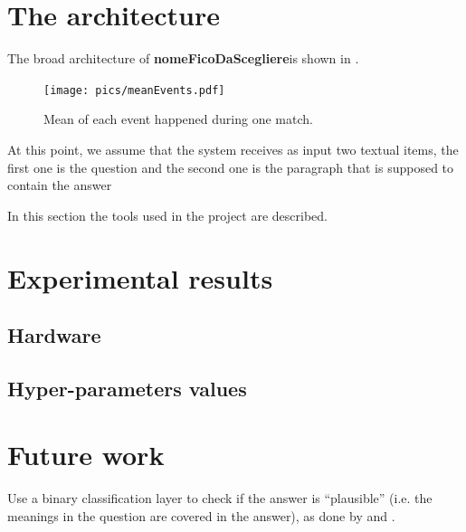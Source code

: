 \documentclass[12pt,a4paper,hidelinks]{article}
\newcommand{\nomefico}{\textbf{nomeFicoDaScegliere}}
\begin{document}
\section{The architecture}\label{sec:model}
The broad architecture of \nomefico is shown in .

\begin{figure}[ht!]
    \centering
    \texttt{[image: pics/meanEvents.pdf]}
    \caption{Mean of each event happened during one match.}
    \label{fig:meanEvents}
\end{figure}
At this point, we assume that the system receives as input two textual items, the first one is the question and the second one is the paragraph that is supposed to contain the answer


In this section the tools used in the project are described.

\section{Experimental results}\label{sec:experimental_results}


\subsection{Hardware}


\subsection{Hyper-parameters values}

\section{Future work}\label{sec:future_work}
Use a binary classification layer to check if the answer is ``plausible'' (i.e. the meanings in the question are covered in the answer), as done by \cite{Hu2019ReadV} and \cite{Back2020NeurQuRI}.
\end{document}
